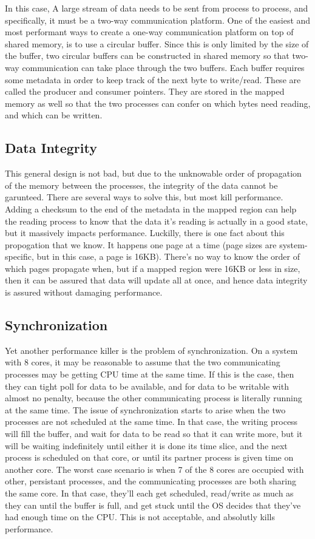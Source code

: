 \documentclass[se]{uw-wkrpt}
\begin{document}
In this case,
A large stream of data needs to be sent from process to process, and specifically, it must be a two-way communication
platform. One of the easiest and most performant ways to create a one-way communication platform on top of shared memory,
is to use a circular buffer. Since this is only limited by the size of the buffer, two circular buffers can be constructed
in shared memory so that two-way communication can take place through the two buffers. Each buffer requires some metadata
in order to keep track of the next byte to write/read. These are called the producer and consumer pointers.
They are stored in the mapped memory as well so that the two processes can confer on which bytes need reading, and 
which can be written.

\subsection{Data Integrity}

This general design is not bad, but due to the unknowable order of propagation of the memory between the processes,
the integrity of the data cannot be garunteed. There are several ways to solve this, but most kill performance. Adding
a checksum to the end of the metadata in the mapped region can help the reading process to know that the data it's reading
is actually in a good state, but it massively impacts performance. Luckilly, there is one fact about this propogation that
we know. It happens one page at a time (page sizes are system-specific, but in this case, a page is 16KB). There's no way 
to know the order of which pages propagate when, but if a mapped region were 16KB or less in size, then it can be assured
that data will update all at once, and hence data integrity is assured without damaging performance.

\subsection{Synchronization}

Yet another performance killer is the problem of synchronization. On a system with 8 cores, it may be reasonable to 
assume that the two communicating processes may be getting CPU time at the same time. If this is the case, then they
can tight poll for data to be available, and for data to be writable with almost no penalty, because the other
communicating process is literally running at the same time. The issue of synchronization starts to arise when the
two processes are not scheduled at the same time. In that case, the writing process will fill the buffer, and wait
for data to be read so that it can write more, but it will be waiting indefinitely until either it is done its time
slice, and the next process is scheduled on that core, or until its partner process is given time on another core.
The worst case scenario is when 7 of the 8 cores are occupied with other, persistant processes, and the communicating
processes are both sharing the same core. In that case, they'll each get scheduled, read/write as much as they can
until the buffer is full, and get stuck until the OS decides that they've had enough time on the CPU. This is
not acceptable, and absolutly kills performance. 
\end{document}
